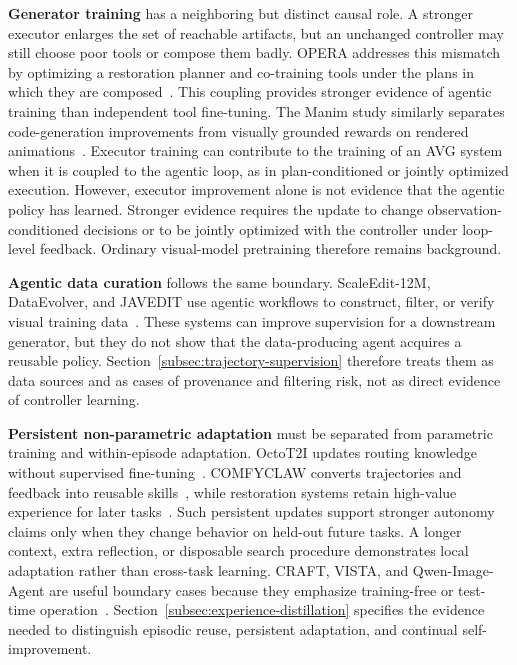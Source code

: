 \textbf{Generator training} has a neighboring but distinct causal role. A stronger executor enlarges the set of reachable artifacts, but an unchanged controller may still choose poor tools or compose them badly. OPERA addresses this mismatch by optimizing a restoration planner and co-training tools under the plans in which they are composed~\cite{avg260522104}. This coupling provides stronger evidence of agentic training than independent tool fine-tuning. The Manim study similarly separates code-generation improvements from visually grounded rewards on rendered animations~\cite{avg260418364}. Executor training can contribute to the training of an AVG system when it is coupled to the agentic loop, as in plan-conditioned or jointly optimized execution. However, executor improvement alone is not evidence that the agentic policy has learned. Stronger evidence requires the update to change observation-conditioned decisions or to be jointly optimized with the controller under loop-level feedback. Ordinary visual-model pretraining therefore remains background.

\textbf{Agentic data curation} follows the same boundary. ScaleEdit-12M, DataEvolver, and JAVEDIT use agentic workflows to construct, filter, or verify visual training data~\cite{avg260320644,avg260603168,avg260631537}. These systems can improve supervision for a downstream generator, but they do not show that the data-producing agent acquires a reusable policy. Section~\ref{subsec:trajectory-supervision} therefore treats them as data sources and as cases of provenance and filtering risk, not as direct evidence of controller learning.

\textbf{Persistent non-parametric adaptation} must be separated from parametric training and within-episode adaptation. OctoT2I updates routing knowledge without supervised fine-tuning~\cite{jiang2026octot2i}. COMFYCLAW converts trajectories and feedback into reusable skills~\cite{avg260701709}, while restoration systems retain high-value experience for later tasks~\cite{avg260628971,avg260202051,avg260522208}. Such persistent updates support stronger autonomy claims only when they change behavior on held-out future tasks. A longer context, extra reflection, or disposable search procedure demonstrates local adaptation rather than cross-task learning. CRAFT, VISTA, and Qwen-Image-Agent are useful boundary cases because they emphasize training-free or test-time operation~\cite{kovalev2025craft,long2026vista,avg260626907}. Section~\ref{subsec:experience-distillation} specifies the evidence needed to distinguish episodic reuse, persistent adaptation, and continual self-improvement.

